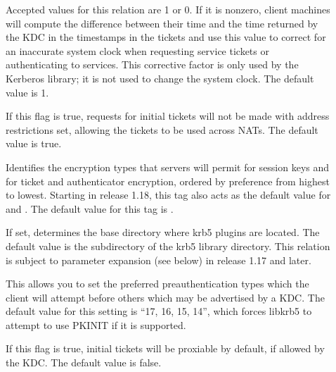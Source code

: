 \documentclass[letterpaper,10pt,english]{sphinxmanual}
\begin{document}
\begin{description}
\item[{}] \leavevmode
Accepted values for this relation are 1 or 0.  If it is nonzero,
client machines will compute the difference between their time and
the time returned by the KDC in the timestamps in the tickets and
use this value to correct for an inaccurate system clock when
requesting service tickets or authenticating to services.  This
corrective factor is only used by the Kerberos library; it is not
used to change the system clock.  The default value is 1.

\item[{}] \leavevmode
If this flag is true, requests for initial tickets will not be
made with address restrictions set, allowing the tickets to be
used across NATs.  The default value is true.

\item[{}] \leavevmode
Identifies the encryption types that servers will permit for
session keys and for ticket and authenticator encryption, ordered
by preference from highest to lowest.  Starting in release 1.18,
this tag also acts as the default value for
 and .  The
default value for this tag is .

\item[{}] \leavevmode
If set, determines the base directory where krb5 plugins are
located.  The default value is the  subdirectory
of the krb5 library directory.  This relation is subject to
parameter expansion (see below) in release 1.17 and later.

\item[{}] \leavevmode
This allows you to set the preferred preauthentication types which
the client will attempt before others which may be advertised by a
KDC.  The default value for this setting is “17, 16, 15, 14”,
which forces libkrb5 to attempt to use PKINIT if it is supported.

\item[{}] \leavevmode
If this flag is true, initial tickets will be proxiable by
default, if allowed by the KDC.  The default value is false.


\end{description}
\end{document}
